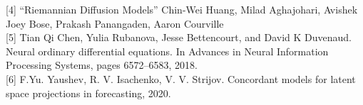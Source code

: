 \documentclass{article}
\begin{document}
[4] “Riemannian Diffusion Models” Chin-Wei Huang, Milad Aghajohari, Avishek Joey Bose, Prakash Panangaden, Aaron Courville \\

[5] Tian Qi Chen, Yulia Rubanova, Jesse Bettencourt, and David K Duvenaud. Neural ordinary differential equations. In Advances in Neural Information Processing Systems, pages 6572–6583, 2018. \\

[6] F.Yu. Yaushev, R. V. Isachenko, V. V. Strijov. Concordant models for latent space projections in forecasting, 2020. \\
\end{document}
